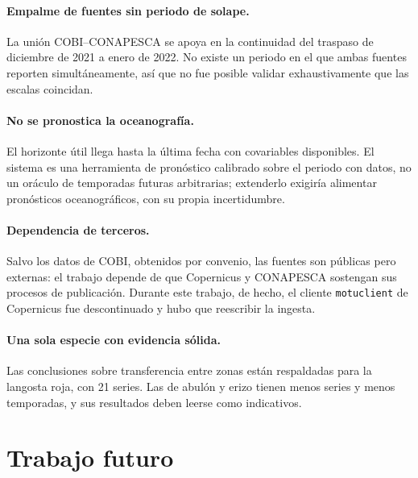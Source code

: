 \paragraph{Empalme de fuentes sin periodo de solape.} La unión COBI--CONAPESCA se apoya en la
continuidad del traspaso de diciembre de 2021 a enero de 2022. No existe un periodo en el que
ambas fuentes reporten simultáneamente, así que no fue posible validar exhaustivamente que las
escalas coincidan.

\paragraph{No se pronostica la oceanografía.} El horizonte útil llega hasta la última fecha con
covariables disponibles. El sistema es una herramienta de pronóstico calibrado sobre el periodo
con datos, no un oráculo de temporadas futuras arbitrarias; extenderlo exigiría alimentar
pronósticos oceanográficos, con su propia incertidumbre.

\paragraph{Dependencia de terceros.} Salvo los datos de COBI, obtenidos por convenio, las
fuentes son públicas pero externas: el trabajo depende de que Copernicus y CONAPESCA sostengan
sus procesos de publicación. Durante este trabajo, de hecho, el cliente \texttt{motuclient} de
Copernicus fue descontinuado y hubo que reescribir la ingesta.

\paragraph{Una sola especie con evidencia sólida.} Las conclusiones sobre transferencia entre
zonas están respaldadas para la langosta roja, con 21 series. Las de abulón y erizo tienen menos
series y menos temporadas, y sus resultados deben leerse como indicativos.

\section{Trabajo futuro}
\label{sec:trabajo_futuro}

